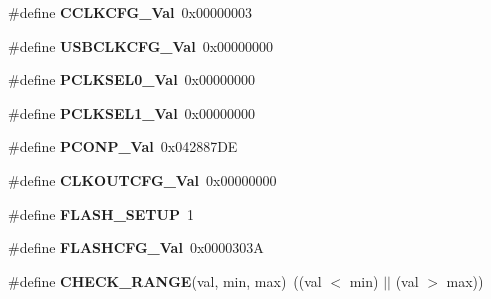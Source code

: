 \begin{DoxyCompactItemize}
\item 
\hypertarget{group___l_p_c17xx___system___defines_ga464e2b89239c8a935c52cf8721fd3d6b}{\#define {\bfseries \-C\-C\-L\-K\-C\-F\-G\-\_\-\-Val}~0x00000003}\label{group___l_p_c17xx___system___defines_ga464e2b89239c8a935c52cf8721fd3d6b}

\item 
\hypertarget{group___l_p_c17xx___system___defines_gabae2ae6c5099e3c0e327d88230123063}{\#define {\bfseries \-U\-S\-B\-C\-L\-K\-C\-F\-G\-\_\-\-Val}~0x00000000}\label{group___l_p_c17xx___system___defines_gabae2ae6c5099e3c0e327d88230123063}

\item 
\hypertarget{group___l_p_c17xx___system___defines_ga34dfbc94a35799892894e6a933ca5243}{\#define {\bfseries \-P\-C\-L\-K\-S\-E\-L0\-\_\-\-Val}~0x00000000}\label{group___l_p_c17xx___system___defines_ga34dfbc94a35799892894e6a933ca5243}

\item 
\hypertarget{group___l_p_c17xx___system___defines_ga93ba8ce0a676a2e32707e9359b579ab6}{\#define {\bfseries \-P\-C\-L\-K\-S\-E\-L1\-\_\-\-Val}~0x00000000}\label{group___l_p_c17xx___system___defines_ga93ba8ce0a676a2e32707e9359b579ab6}

\item 
\hypertarget{group___l_p_c17xx___system___defines_gaf29be85f9b711ec65a52284c1a6c96d4}{\#define {\bfseries \-P\-C\-O\-N\-P\-\_\-\-Val}~0x042887\-D\-E}\label{group___l_p_c17xx___system___defines_gaf29be85f9b711ec65a52284c1a6c96d4}

\item 
\hypertarget{group___l_p_c17xx___system___defines_gac2ce57d037a6de9c38a38fb421c5dcf0}{\#define {\bfseries \-C\-L\-K\-O\-U\-T\-C\-F\-G\-\_\-\-Val}~0x00000000}\label{group___l_p_c17xx___system___defines_gac2ce57d037a6de9c38a38fb421c5dcf0}

\item 
\hypertarget{group___l_p_c17xx___system___defines_gaf55848191b98ff9fa28b7bde1e251e0a}{\#define {\bfseries \-F\-L\-A\-S\-H\-\_\-\-S\-E\-T\-U\-P}~1}\label{group___l_p_c17xx___system___defines_gaf55848191b98ff9fa28b7bde1e251e0a}

\item 
\hypertarget{group___l_p_c17xx___system___defines_gaf1aa676c55cb66fa559965efba325ec1}{\#define {\bfseries \-F\-L\-A\-S\-H\-C\-F\-G\-\_\-\-Val}~0x0000303\-A}\label{group___l_p_c17xx___system___defines_gaf1aa676c55cb66fa559965efba325ec1}

\item 
\hypertarget{group___l_p_c17xx___system___defines_ga773c8761088ae68a786a4c72bb42deec}{\#define {\bfseries \-C\-H\-E\-C\-K\-\_\-\-R\-A\-N\-G\-E}(val, min, max)~((val $<$ min) $|$$|$ (val $>$ max))}\label{group___l_p_c17xx___system___defines_ga773c8761088ae68a786a4c72bb42deec}


\end{DoxyCompactItemize}
